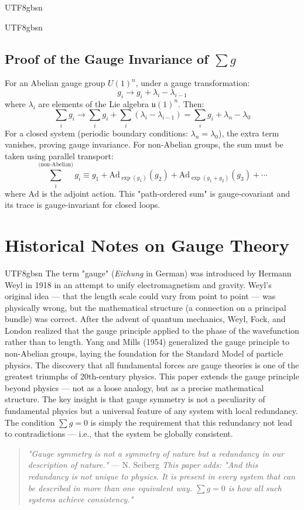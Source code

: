 \documentclass[11pt,a4paper]{article}
\begin{document}
\begin{CJK}{UTF8}{gbsn}
{\begin{CJK}{UTF8}{gbsn}
\subsection{Proof of the Gauge Invariance of $\sum g$}
For an Abelian gauge group $U(1)^n$, under a gauge transformation:
\begin{equation}
    g_i \to g_i + \lambda_i - \lambda_{i-1}
\end{equation}
where $\lambda_i$ are elements of the Lie algebra $\mathfrak{u}(1)^n$. Then:
\begin{equation}
    \sum_i g_i \to \sum_i g_i + \sum_i (\lambda_i - \lambda_{i-1})
                     = \sum_i g_i + \lambda_n - \lambda_0
\end{equation}
For a closed system (periodic boundary conditions: $\lambda_n = \lambda_0$),
the extra term vanishes, proving gauge invariance.
For non-Abelian groups, the sum must be taken using parallel transport:
\begin{equation}
    \sum_i^{\text{(non-Abelian)}} g_i \equiv
    g_1 + \mathrm{Ad}_{\exp(g_1)}(g_2) + \mathrm{Ad}_{\exp(g_1+g_2)}(g_3) + \cdots
\end{equation}
where $\mathrm{Ad}$ is the adjoint action. This "path-ordered sum" is gauge-covariant
and its trace is gauge-invariant for closed loops.
\end{CJK}
\section{Historical Notes on Gauge Theory}
\begin{CJK}{UTF8}{gbsn}
The term "gauge" (\textit{Eichung} in German) was introduced by Hermann Weyl in 1918
in an attempt to unify electromagnetism and gravity. Weyl's original idea --- that
the length scale could vary from point to point --- was physically wrong, but the
mathematical structure (a connection on a principal bundle) was correct. After the
advent of quantum mechanics, Weyl, Fock, and London realized that the gauge principle
applied to the phase of the wavefunction rather than to length.
Yang and Mills (1954) generalized the gauge principle to non-Abelian groups,
laying the foundation for the Standard Model of particle physics. The discovery
that all fundamental forces are gauge theories is one of the greatest triumphs
of 20th-century physics.
This paper extends the gauge principle beyond physics --- not as a loose analogy,
but as a precise mathematical structure. The key insight is that gauge symmetry
is not a peculiarity of fundamental physics but a universal feature of any system
with local redundancy. The condition $\sum g = 0$ is simply the requirement that
this redundancy not lead to contradictions --- i.e., that the system be globally
consistent.
\begin{quote}
    \textit{"Gauge symmetry is not a symmetry of nature but a redundancy in our
    description of nature."} --- N. Seiberg
    \textit{This paper adds: "And this redundancy is not unique to physics. It is
    present in every system that can be described in more than one equivalent way.
    $\sum g = 0$ is how all such systems achieve consistency."}
\end{quote}
\end{CJK}
}
\end{CJK}
\end{document}
